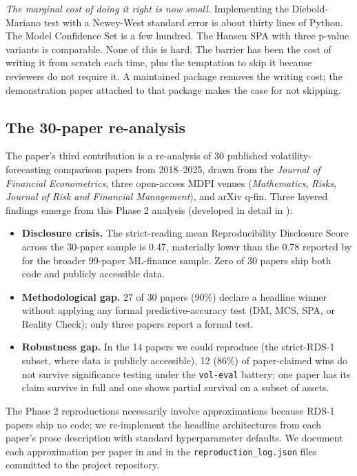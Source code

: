 \textit{The marginal cost of doing it right is now small.} Implementing the Diebold-Mariano test with a Newey-West standard error is about thirty lines of Python. The Model Confidence Set is a few hundred. The Hansen SPA with three p-value variants is comparable. None of this is hard. The barrier has been the cost of writing it from scratch each time, plus the temptation to skip it because reviewers do not require it. A maintained package removes the writing cost; the demonstration paper attached to that package makes the case for not skipping.

\subsection{The 30-paper re-analysis}

The paper's third contribution is a re-analysis of 30 published volatility-forecasting comparison papers from 2018--2025, drawn from the \emph{Journal of Financial Econometrics}, three open-access MDPI venues (\emph{Mathematics}, \emph{Risks}, \emph{Journal of Risk and Financial Management}), and arXiv q-fin. Three layered findings emerge from this Phase 2 analysis (developed in detail in ):

\begin{itemize}[leftmargin=*]
    \item \textbf{Disclosure crisis.} The strict-reading mean Reproducibility Disclosure Score across the 30-paper sample is 0.47, materially lower than the 0.78 reported by \citet{Khan2026Survey} for the broader 99-paper ML-finance sample. Zero of 30 papers ship both code and publicly accessible data.
    \item \textbf{Methodological gap.} 27 of 30 papers (90\%) declare a headline winner without applying any formal predictive-accuracy test (DM, MCS, SPA, or Reality Check); only three papers report a formal test.
    \item \textbf{Robustness gap.} In the 14 papers we could reproduce (the strict-RDS-1 subset, where data is publicly accessible), 12 (86\%) of paper-claimed wins do not survive significance testing under the \texttt{vol-eval} battery; one paper has its claim survive in full and one shows partial survival on a subset of assets.
\end{itemize}

The Phase 2 reproductions necessarily involve approximations because RDS-1 papers ship no code; we re-implement the headline architectures from each paper's prose description with standard hyperparameter defaults. We document each approximation per paper in  and in the \texttt{reproduction\_log.json} files committed to the project repository.

